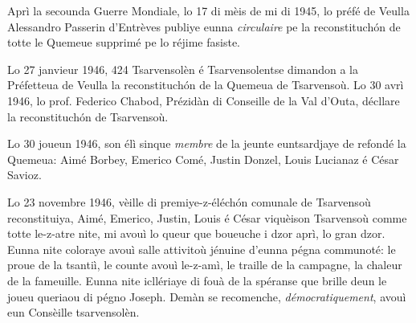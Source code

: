 


\DramPer


Aprì la secounda Guerre Mondiale, lo 17 di mèis de mi di 1945, lo préfé de Veulla Alessandro Passerin d'Entrèves publiye eunna \textit{circulaire} pe la reconstituch\'on de totte le Quemeue supprimé pe lo réjime fasiste.

Lo 27 janvieur 1946, 424 Tsarvensolèn é Tsarvensolentse dimandon a la Préfetteua de Veulla la reconstituch\'on de la Quemeua de Tsarvensoù. Lo 30 avrì 1946, lo prof. Federico Chabod, Prézidàn di Conseille de la Val d'Outa, décllare la reconstituch\'on de Tsarvensoù.

Lo 30 joueun 1946, son élì sinque \textit{membre} de la jeunte euntsardjaye de refondé la Quemeua: Aimé Borbey, Emerico Comé, Justin Donzel, Louis Lucianaz é César Savioz.

Lo 23 novembre 1946, vèille di premiye-z-éléch\'on comunale de Tsarvensoù reconstituiya, Aimé, Emerico, Justin, Louis é César viquèison Tsarvensoù comme totte le-z-atre nite, mi avouì lo queur que  boueuche i dzor aprì, lo gran dzor. Eunna nite coloraye avouì salle attivitoù jénuine d'eunna pégna communoté: le proue de la tsantiì, le counte avouì le-z-amì, le traille de la campagne, la chaleur de la fameuille. Eunna nite icllériaye di fouà de la spéranse que brille deun le joueu  queriaou di pégno Joseph. Demàn se recomenche, \textit{démocratiquement}, avouì eun Consèille tsarvensolèn.

\DeriLeRido
{}
